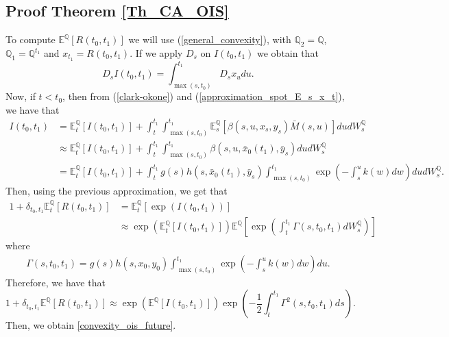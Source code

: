\documentclass[a4paper,10pt]{article}
\newcommand{\1}{\mathbf{1}}
\begin{document}
\subsection{Proof Theorem \ref{Th_CA_OIS}}\label{Proof_CA_OIS_futures}
To compute $\mathbb{E}^{\mathbb{Q}}\left[R(t_0,t_1)\right]$ we will use (\ref{general_convexity}), with $\mathbb{Q}_2 = \mathbb{Q}$, $\mathbb{Q}_1 = \mathbb{Q}^{t_1}$ and $x_{t_1}=R(t_0,t_1)$. If we apply $D_s$ on $I(t_0,t_1)$ we obtain that
\begin{equation*}
D_s I(t_0,t_1) = \int_{\max(s, t_{0})}^{t_1}  D_s x_u du.
\end{equation*}
Now, if $t < t_0$, then from (\ref{clark-okone}) and (\ref{approximation_spot_E_s_x_t}), we have that 
\begin{align}\label{apprx_I_t0_t1}
I(t_0,t_1) &= \mathbb{E}_t^{\mathbb{Q}}\left[I(t_0,t_1)\right] + \int_{t}^{t_1}\int_{\max(s, t_{0})}^{t_1}  \mathbb{E}_s^{\mathbb{Q}}\left[\beta(s,u,x_s,y_s) \bar{M}(s,u) \right] du dW_s^{\mathbb{Q}} \nonumber \\
&\approx \mathbb{E}_t^{\mathbb{Q}}\left[I(t_0,t_1)\right] + \int_{t}^{t_1}\int_{\max(s, t_{0})}^{t_1} \beta(s,u,\bar{x}_0(t_1),\bar{y}_s) du dW_s^{\mathbb{Q}}\nonumber \\
&= \mathbb{E}_t^{\mathbb{Q}}\left[I(t_0,t_1)\right] + \int_{t}^{t_1} g(s)h(s,\bar{x}_0(t_1),\bar{y}_s)\int_{\max(s, t_{0})}^{t_1} \exp\left( -\int_{s}^{u} k(w)dw \right) du dW_s^{\mathbb{Q}}.
\end{align}
Then, using the previous approximation, we get that
\begin{align*}
1 + \delta_{t_0,t_1}\mathbb{E}_t^{\mathbb{Q}}\left[R(t_0,t_1)\right] &= \mathbb{E}_t^{\mathbb{Q}}\left[ \exp(I(t_0,t_1)) \right]\\
&\approx \exp\left(\mathbb{E}_t^{\mathbb{Q}}\left[I(t_0,t_1)\right]\right)  \mathbb{E}^{\mathbb{Q}}\left[\exp\left(\int_{t}^{t_1} \Gamma(s,t_0,t_1)dW_s^{\mathbb{Q}}\right)\right]
\end{align*}
where 
\begin{align*}
\Gamma(s,t_0,t_1)= g(s)h(s,x_0,y_0)\int_{\max(s, t_{0})}^{t_1} \exp\left( -\int_{s}^{u} k(w)dw \right)du.
\end{align*}
Therefore, we have that
\begin{equation}\label{representation_i_0_t}
1 + \delta_{t_0,t_1}\mathbb{E}^{\mathbb{Q}}\left[R(t_0,t_1)\right] \approx \exp\left(\mathbb{E}^{\mathbb{Q}}\left[I(t_0,t_1)\right]\right)\exp\left(-\frac{1}{2}\int_{t}^{t_1}\Gamma^{2}(s,t_0,t_1) ds\right).
\end{equation}
Then, we obtain \eqref{convexity_ois_future}.\\
\end{document}
